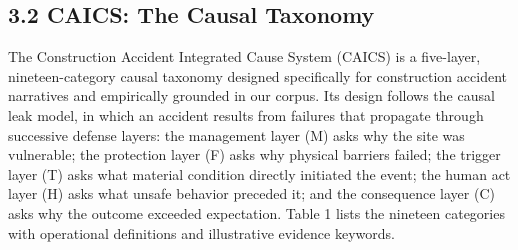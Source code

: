 \documentclass[11pt]{article}
\begin{document}
\subsection{3.2 CAICS: The Causal Taxonomy}
The Construction Accident Integrated Cause System (CAICS) is a five-layer, nineteen-category causal taxonomy designed specifically for construction accident narratives and empirically grounded in our corpus. Its design follows the causal leak model, in which an accident results from failures that propagate through successive defense layers: the management layer (M) asks why the site was vulnerable; the protection layer (F) asks why physical barriers failed; the trigger layer (T) asks what material condition directly initiated the event; the human act layer (H) asks what unsafe behavior preceded it; and the consequence layer (C) asks why the outcome exceeded expectation. Table 1 lists the nineteen categories with operational definitions and illustrative evidence keywords.
\end{document}
